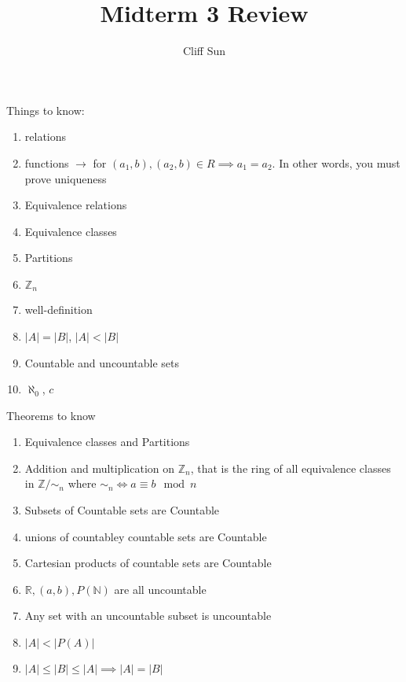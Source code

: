 \documentclass{article}
\title{Midterm 3 Review}
\author{Cliff Sun}
\begin{document}
\maketitle

Things to know:
\begin{enumerate}
    \item relations
    \item functions $\rightarrow$ for $(a_1,b), (a_2,b) \in R \implies a_1 = a_2$. In other words, you must prove uniqueness
    \item Equivalence relations
    \item Equivalence classes
    \item Partitions
    \item $\mathbb{Z}_n$
    \item well-definition
    \item $|A| = |B|$, $|A| < |B|$
    \item Countable and uncountable sets
    \item $\aleph_0$, $c$
\end{enumerate}

Theorems to know
\begin{enumerate}
    \item Equivalence classes and Partitions
    \item Addition and multiplication on $\mathbb{Z}_n$, that is the ring of all equivalence classes in $\mathbb{Z}/\sim_n$ where $\sim_n \iff a \equiv b \mod n$
    \item Subsets of Countable sets are Countable
    \item unions of countabley countable sets are Countable
    \item Cartesian products of countable sets are Countable
    \item $\mathbb{R}, (a,b), P(\mathbb{N})$ are all uncountable
    \item Any set with an uncountable subset is uncountable
    \item $|A| < |P(A)|$
    \item $|A| \leq |B| \leq |A| \implies |A| = |B|$
\end{enumerate}
\end{document}
